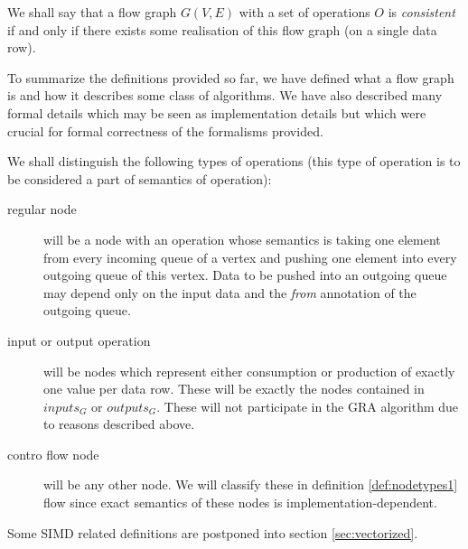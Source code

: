   We shall say that a flow graph $G(V,E)$ with a set of operations $O$ is \emph{consistent} if and only if there exists some realisation of this flow graph (on a single data row). 
\myenddef


To summarize the definitions provided so far, we have defined what a flow graph is and how it describes some class of algorithms. We have also described many formal details which may be seen as implementation details but which were crucial for formal correctness of the formalisms provided.

  We shall distinguish the following types of operations (this type of operation is to be considered a part of semantics of operation):
\begin{description}
  \item [regular node] will be a node with an operation whose semantics is taking one element from every incoming queue of a vertex and pushing one element into every outgoing queue of this vertex. Data to be pushed into an outgoing queue may depend only on the input data and the \emph{from} annotation of the outgoing queue.
\item [input or output operation] will be nodes which represent either consumption or production of exactly one value per data row.  These will be exactly the nodes contained in $inputs_G$ or $outputs_G$. These will not participate in the GRA algorithm due to reasons described above.
\item [contro flow node] will be any other node. We will classify these in definition \ref{def:nodetypes1} flow since exact semantics of these nodes is implementation-dependent. 
\end{description}
\myenddef

  Some SIMD related definitions are postponed into section \ref{sec:vectorized}.


